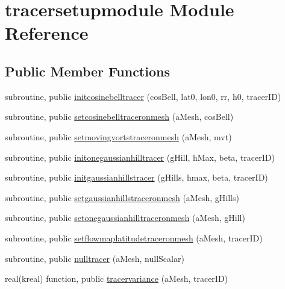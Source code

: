 \hypertarget{classtracersetupmodule}{\section{tracersetupmodule Module Reference}
\label{classtracersetupmodule}
}
\subsection*{Public Member Functions}
\begin{DoxyCompactItemize}
\item 
subroutine, public \hyperlink{classtracersetupmodule_a20e092545b71ecb6dc10d7414ec03b61}{initcosinebelltracer} (cos\+Bell, lat0, lon0, rr, h0, tracer\+I\+D)
\item 
subroutine, public \hyperlink{classtracersetupmodule_aedac0798d66e1ec834a2996971177dc6}{setcosinebelltraceronmesh} (a\+Mesh, cos\+Bell)
\item 
subroutine, public \hyperlink{classtracersetupmodule_ac30ca4270fa366d7bcd76899c6f5e8c2}{setmovingvortstraceronmesh} (a\+Mesh, mvt)
\item 
subroutine, public \hyperlink{classtracersetupmodule_aa4126f1be402c40d33266316b37ec896}{initonegaussianhilltracer} (g\+Hill, h\+Max, beta, tracer\+I\+D)
\item 
subroutine, public \hyperlink{classtracersetupmodule_a2a7157a473fdc3bd4ee8a2d3b0641ed1}{initgaussianhillstracer} (g\+Hills, hmax, beta, tracer\+I\+D)
\item 
subroutine, public \hyperlink{classtracersetupmodule_a1001c1749600a4be18d9ecc91de26ace}{setgaussianhillstraceronmesh} (a\+Mesh, g\+Hills)
\item 
subroutine, public \hyperlink{classtracersetupmodule_a264b31eac8bb7bd2344d2c671d487727}{setonegaussianhilltraceronmesh} (a\+Mesh, g\+Hill)
\item 
subroutine, public \hyperlink{classtracersetupmodule_ad96445741d21de9d675c87ace9d540e5}{setflowmaplatitudetraceronmesh} (a\+Mesh, tracer\+I\+D)
\item 
subroutine, public \hyperlink{classtracersetupmodule_a9e0f459188493a18ff6c57cfb2d8bab8}{nulltracer} (a\+Mesh, null\+Scalar)
\item 
real(kreal) function, public \hyperlink{classtracersetupmodule_a9e384760bc19613212a17ea3a263ce02}{tracervariance} (a\+Mesh, tracer\+I\+D)
\end{DoxyCompactItemize}
